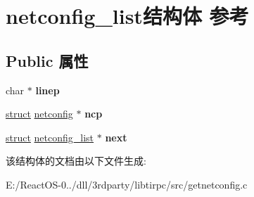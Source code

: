 \hypertarget{structnetconfig__list}{}\section{netconfig\+\_\+list结构体 参考}
\label{structnetconfig__list}
\subsection*{Public 属性}
\begin{DoxyCompactItemize}
\item 
\mbox{\label{structnetconfig__list_ab141a81d58afe60b0e7b942c7979adc5}} 
char $\ast$ {\bfseries linep}
\item 
\mbox{\label{structnetconfig__list_a8abc66af960ace467a00e8f2af2f362a}} 
\hyperlink{interfacestruct}{struct} \hyperlink{structnetconfig}{netconfig} $\ast$ {\bfseries ncp}
\item 
\mbox{\label{structnetconfig__list_a76c540b79f01a4b40fe90b5ffc6e655b}} 
\hyperlink{interfacestruct}{struct} \hyperlink{structnetconfig__list}{netconfig\+\_\+list} $\ast$ {\bfseries next}
\end{DoxyCompactItemize}


该结构体的文档由以下文件生成\+:\begin{DoxyCompactItemize}
\item 
E\+:/\+React\+O\+S-\/0../dll/3rdparty/libtirpc/src/getnetconfig.\+c\end{DoxyCompactItemize}
